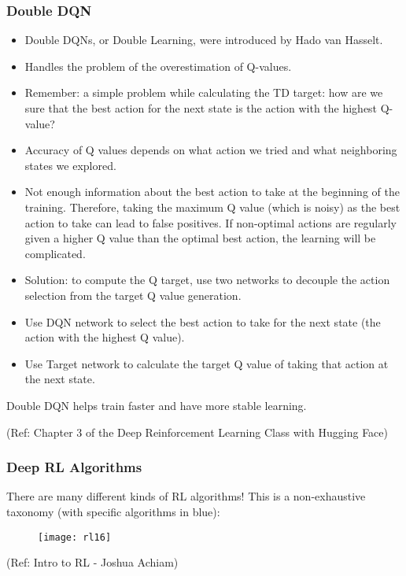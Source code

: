 \begin{frame}[fragile]\frametitle{Double DQN}


\begin{itemize}
\item Double DQNs, or Double Learning, were introduced by Hado van Hasselt. 
\item Handles the problem of the overestimation of Q-values.
\item Remember: a simple problem while calculating the TD target: how are we sure that the best action for the next state is the action with the highest Q-value?
\item Accuracy of Q values depends on what action we tried and what neighboring states we explored.
\item Not enough information about the best action to take at the beginning of the training. Therefore, taking the maximum Q value (which is noisy) as the best action to take can lead to false positives. If non-optimal actions are regularly given a higher Q value than the optimal best action, the learning will be complicated.
\item Solution: to compute the Q target, use two networks to decouple the action selection from the target Q value generation. 
\item Use DQN network to select the best action to take for the next state (the action with the highest Q value).
\item Use Target network to calculate the target Q value of taking that action at the next state.
\end{itemize}

Double DQN helps train faster and have more stable learning.

{\tiny (Ref: Chapter 3 of the Deep Reinforcement Learning Class with Hugging Face)}

\end{frame}




\begin{frame}[fragile]\frametitle{Deep RL Algorithms}

There are many different kinds of RL algorithms! This is a non-exhaustive taxonomy (with specific algorithms in blue):
\begin{figure}
\centering
\texttt{[image: rl16]}
\end{figure}

{\tiny (Ref: Intro to RL - Joshua Achiam)}


\end{frame}

